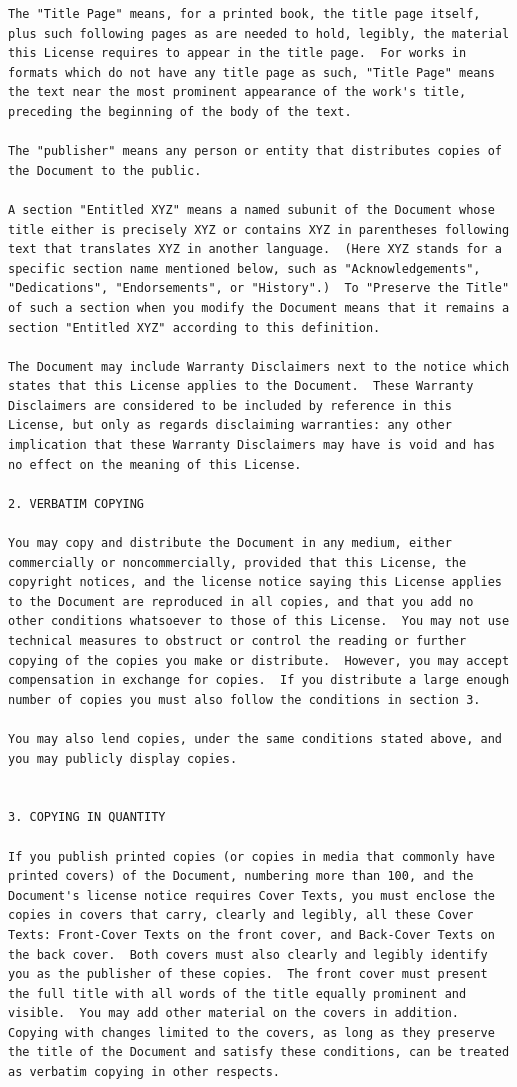 \documentclass[letterpaper,10pt,english]{sphinxmanual}
\begin{document}
\begin{Verbatim}[commandchars=\\\{\}]
The "Title Page" means, for a printed book, the title page itself,
plus such following pages as are needed to hold, legibly, the material
this License requires to appear in the title page.  For works in
formats which do not have any title page as such, "Title Page" means
the text near the most prominent appearance of the work's title,
preceding the beginning of the body of the text.

The "publisher" means any person or entity that distributes copies of
the Document to the public.

A section "Entitled XYZ" means a named subunit of the Document whose
title either is precisely XYZ or contains XYZ in parentheses following
text that translates XYZ in another language.  (Here XYZ stands for a
specific section name mentioned below, such as "Acknowledgements",
"Dedications", "Endorsements", or "History".)  To "Preserve the Title"
of such a section when you modify the Document means that it remains a
section "Entitled XYZ" according to this definition.

The Document may include Warranty Disclaimers next to the notice which
states that this License applies to the Document.  These Warranty
Disclaimers are considered to be included by reference in this
License, but only as regards disclaiming warranties: any other
implication that these Warranty Disclaimers may have is void and has
no effect on the meaning of this License.

2. VERBATIM COPYING

You may copy and distribute the Document in any medium, either
commercially or noncommercially, provided that this License, the
copyright notices, and the license notice saying this License applies
to the Document are reproduced in all copies, and that you add no
other conditions whatsoever to those of this License.  You may not use
technical measures to obstruct or control the reading or further
copying of the copies you make or distribute.  However, you may accept
compensation in exchange for copies.  If you distribute a large enough
number of copies you must also follow the conditions in section 3.

You may also lend copies, under the same conditions stated above, and
you may publicly display copies.


3. COPYING IN QUANTITY

If you publish printed copies (or copies in media that commonly have
printed covers) of the Document, numbering more than 100, and the
Document's license notice requires Cover Texts, you must enclose the
copies in covers that carry, clearly and legibly, all these Cover
Texts: Front-Cover Texts on the front cover, and Back-Cover Texts on
the back cover.  Both covers must also clearly and legibly identify
you as the publisher of these copies.  The front cover must present
the full title with all words of the title equally prominent and
visible.  You may add other material on the covers in addition.
Copying with changes limited to the covers, as long as they preserve
the title of the Document and satisfy these conditions, can be treated
as verbatim copying in other respects.


\end{Verbatim}
\end{document}
